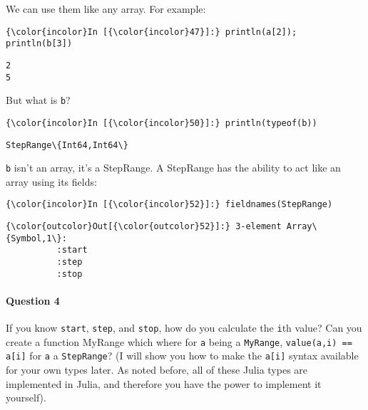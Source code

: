 \documentclass[11pt]{article}
\begin{document}
    We can use them like any array. For example:

    \begin{Verbatim}[commandchars=\\\{\}]
{\color{incolor}In [{\color{incolor}47}]:} println(a[2]); println(b[3])
\end{Verbatim}

    \begin{Verbatim}[commandchars=\\\{\}]
2
5

    \end{Verbatim}

    But what is \texttt{b}?

    \begin{Verbatim}[commandchars=\\\{\}]
{\color{incolor}In [{\color{incolor}50}]:} println(typeof(b))
\end{Verbatim}

    \begin{Verbatim}[commandchars=\\\{\}]
StepRange\{Int64,Int64\}

    \end{Verbatim}

    \texttt{b} isn't an array, it's a StepRange. A StepRange has the ability
to act like an array using its fields:

    \begin{Verbatim}[commandchars=\\\{\}]
{\color{incolor}In [{\color{incolor}52}]:} fieldnames(StepRange)
\end{Verbatim}

            \begin{Verbatim}[commandchars=\\\{\}]
{\color{outcolor}Out[{\color{outcolor}52}]:} 3-element Array\{Symbol,1\}:
          :start
          :step 
          :stop 
\end{Verbatim}
        
    \paragraph{Question 4}\label{question-4}

If you know \texttt{start}, \texttt{step}, and \texttt{stop}, how do you
calculate the \texttt{i}th value? Can you create a function MyRange
which where for \texttt{a} being a \texttt{MyRange},
\texttt{value(a,i) == a{[}i{]}} for \texttt{a} a \texttt{StepRange}? (I
will show you how to make the \texttt{a{[}i{]}} syntax available for
your own types later. As noted before, all of these Julia types are
implemented in Julia, and therefore you have the power to implement it
yourself).
\end{document}
